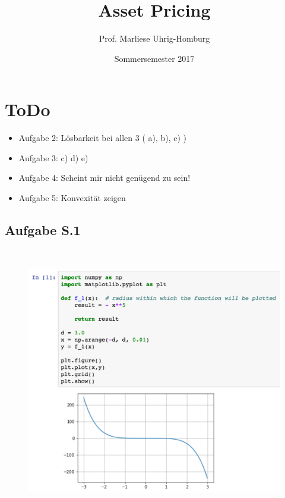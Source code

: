 \documentclass[12pt]{extreport} %
\title{Asset Pricing}
\author{Prof. Marliese Uhrig-Homburg}
\date{Sommersemester 2017}
\theoremstyle{named}
\theoremstyle{nnamed}
\theoremstyle{itshape}
\theoremstyle{normal}
\begin{document}
\thispagestyle{empty}


\section*{ToDo}

\begin{itemize}
	\item Aufgabe 2: Lösbarkeit bei allen 3 ( a), b), c) )
	\item Aufgabe 3: c) d) e)
	\item Aufgabe 4: Scheint mir nicht genügend zu sein!
	\item Aufgabe 5: Konvexität zeigen
\end{itemize}

\newpage

\subsection*{Aufgabe S.1} ~\\

\begin{figure}[h!]
  \centering
  \includegraphics[scale=0.325]{img/sui-i}
  \label{fig:sub1}
\end{figure} ~\\
\end{document}
